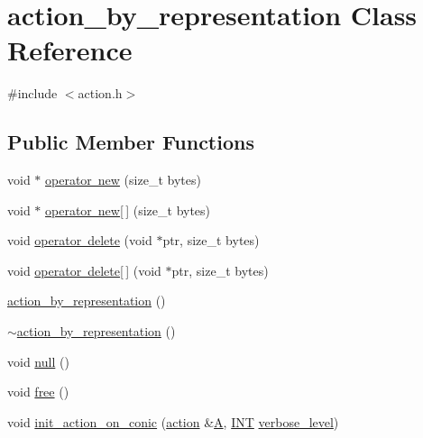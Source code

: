 \hypertarget{classaction__by__representation}{}\section{action\+\_\+by\+\_\+representation Class Reference}
\label{classaction__by__representation}


{\ttfamily \#include $<$action.\+h$>$}

\subsection*{Public Member Functions}
\begin{DoxyCompactItemize}
\item 
void $\ast$ \mbox{\hyperlink{classaction__by__representation_a408e66e2a878a1ebdcfef9b9cb7d6ee6}{operator new}} (size\+\_\+t bytes)
\item 
void $\ast$ \mbox{\hyperlink{classaction__by__representation_a768955519d7b7d0e95ae367bc4869074}{operator new\mbox{[}$\,$\mbox{]}}} (size\+\_\+t bytes)
\item 
void \mbox{\hyperlink{classaction__by__representation_a2f00a6d2378df7b5b3616a8673404581}{operator delete}} (void $\ast$ptr, size\+\_\+t bytes)
\item 
void \mbox{\hyperlink{classaction__by__representation_a690a5e17a832f9f9d053bd934f91d418}{operator delete\mbox{[}$\,$\mbox{]}}} (void $\ast$ptr, size\+\_\+t bytes)
\item 
\mbox{\hyperlink{classaction__by__representation_aef60b4ecc561fafacb3bdeac5654c368}{action\+\_\+by\+\_\+representation}} ()
\item 
\mbox{\hyperlink{classaction__by__representation_a29225e48aef1539cccf31a42137f74dc}{$\sim$action\+\_\+by\+\_\+representation}} ()
\item 
void \mbox{\hyperlink{classaction__by__representation_ad4b51df491a8c55bb7262089dd72a543}{null}} ()
\item 
void \mbox{\hyperlink{classaction__by__representation_a5c15d8c83b57bf274020672890e1e1f3}{free}} ()
\item 
void \mbox{\hyperlink{classaction__by__representation_af671877ad58ec641e3ddbc3917a6f367}{init\+\_\+action\+\_\+on\+\_\+conic}} (\mbox{\hyperlink{classaction}{action}} \&\mbox{\hyperlink{simeon_8_c_a97833f04c3a9c008df5521a2fc291bb4}{A}}, \mbox{\hyperlink{galois_8h_a09fddde158a3a20bd2dcadb609de11dc}{I\+NT}} \mbox{\hyperlink{simeon_8_c_a818073fbcc2f439e7c56952f67386122}{verbose\+\_\+level}})

\end{DoxyCompactItemize}
